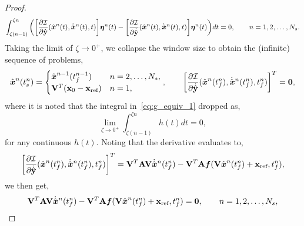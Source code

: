 \begin{proof}
\begin{equation}\label{eq:g_equiv_1}
 \int_{\zeta (n-1)}^{\zeta n} \bigg(\bigg[ \frac{\partial \minintegrandArg{n}  }{\partial \genstateyDiscrete} (\genstateArg{n}{t},\genstateDotArg{n}{t},t)  \bigg] \variationArgntt{n}{t}  - \bigg[ \frac{\partial \minintegrandArg{n}}{\partial \dot{\genstateyDiscrete}} (\genstateArg{n}{t},\genstateDotArg{n}{t},t) \bigg] \variationArgntt{n}{t} \bigg)dt= 0, \qquad n = 1,2,\ldots,\nslabs.
\end{equation}
Taking the limit of $\zeta \rightarrow 0^+$, we collapse the window size to obtain the (infinite) sequence of problems,
\begin{equation*}
 \genstateArg{n}{\timeStartArg{n}} = 
\begin{cases}
\genstate^{n-1}(\timeEndArg{n-1}) & n=2,\ldots,\nslabs,\\
\genstateIC & n=1, \end{cases}, \qquad
\bigg[ \frac{\partial \minintegrandArg{n}}{\partial \dot{\genstateyDiscrete}}(\genstateArg{n}{\timeEndArg{n}},\genstateDotArg{n}{\timeEndArg{n}},\timeEndArg{n}) \bigg]^T= \boldsymbol 0,
\end{equation*}
where it is noted that the integral in~\eqref{eq:g_equiv_1} dropped as,
 \begin{equation*}
\lim_{\zeta \rightarrow 0^+}  \int_{\zeta (n-1)}^{\zeta n} h(t) dt = 0, 
\end{equation*}
for any continuous $h(t)$.
Noting that the derivative evaluates to,
\begin{equation*}
\bigg[ \frac{\partial \minintegrandArg{n}}{\partial \dot{\genstateyDiscrete}}(\genstateArg{n}{\timeEndArg{n}},\genstateDotArg{n}{\timeEndArg{n}},\timeEndArg{n}) \bigg]^T=
\basisspace^T \stweightingMatArgt{n}{\timeEndArg{n}} \basisspace \genstateDotArg{n}{\timeEndArg{n}} -  \basisspace^T \stweightingMatArgt{n}{\timeEndArg{n}} \velocity(\basisspace \genstateArg{n}{\timeEndArg{n}} + \stateIntercept ,\timeEndArg{n}), 
\end{equation*}
we then get,
\begin{equation*}
\basisspace^T \stweightingMatArgt{n}{\timeEndArg{n}} \basisspace \genstateDotArg{n}{\timeEndArg{n}} -  \basisspace^T \stweightingMatArgt{n}{\timeEndArg{n}} \velocity(\basisspace \genstateArg{n}{\timeEndArg{n}} + \stateIntercept ,\timeEndArg{n}) = \bz, \qquad n=1,2,\ldots,\nslabs, 

\end{equation*}
\end{proof}
